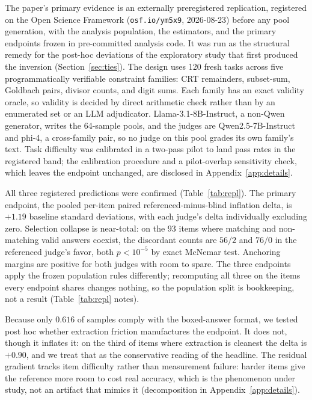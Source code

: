 \documentclass[11pt]{article}
\begin{document}
The paper's primary evidence is an externally preregistered replication, registered on the Open Science Framework (\texttt{osf.io/ym5x9}, 2026-08-23) before any pool generation, with the analysis population, the estimators, and the primary endpoints frozen in pre-committed analysis code.
It was run as the structural remedy for the post-hoc deviations of the exploratory study that first produced the inversion (Section~\ref{sec:ties}).
The design uses 120 fresh tasks across five programmatically verifiable constraint families: CRT remainders, subset-sum, Goldbach pairs, divisor counts, and digit sums.
Each family has an exact validity oracle, so validity is decided by direct arithmetic check rather than by an enumerated set or an LLM adjudicator.
Llama-3.1-8B-Instruct, a non-Qwen generator, writes the 64-sample pools, and the judges are Qwen2.5-7B-Instruct and phi-4, a cross-family pair, so no judge on this pool grades its own family's text.
Task difficulty was calibrated in a two-pass pilot to land pass rates in the registered band; the calibration procedure and a pilot-overlap sensitivity check, which leaves the endpoint unchanged, are disclosed in Appendix~\ref{app:details}.

All three registered predictions were confirmed (Table~\ref{tab:repl}).
The primary endpoint, the pooled per-item paired referenced-minus-blind inflation delta, is $+1.19$ baseline standard deviations, with each judge's delta individually excluding zero.
Selection collapse is near-total: on the 93 items where matching and non-matching valid answers coexist, the discordant counts are $56/2$ and $76/0$ in the referenced judge's favor, both $p < 10^{-5}$ by exact McNemar test.
Anchoring margins are positive for both judges with room to spare.
The three endpoints apply the frozen population rules differently; recomputing all three on the items every endpoint shares changes nothing, so the population split is bookkeeping, not a result (Table~\ref{tab:repl} notes).

Because only $0.616$ of samples comply with the boxed-answer format, we tested post hoc whether extraction friction manufactures the endpoint.
It does not, though it inflates it: on the third of items where extraction is cleanest the delta is $+0.90$, and we treat that as the conservative reading of the headline.
The residual gradient tracks item difficulty rather than measurement failure: harder items give the reference more room to cost real accuracy, which is the phenomenon under study, not an artifact that mimics it (decomposition in Appendix~\ref{app:details}).
\end{document}
